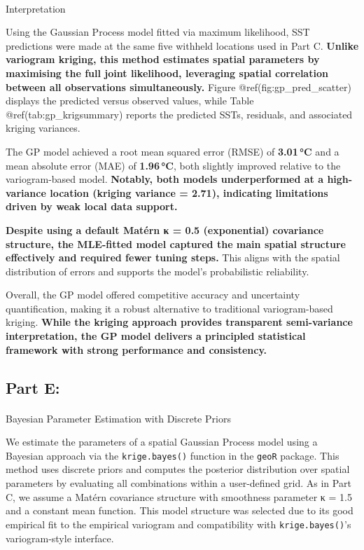 \documentclass[
  11pt,
]{article}
\makeatletter
\let\oldparagraph\paragraph
\renewcommand{\paragraph}{
    \@ifstar
      \xxxParagraphStar
      \xxxParagraphNoStar
  }
\newcommand{\xxxParagraphStar}[1]{\oldparagraph*{#1}\mbox{}}
\newcommand{\xxxParagraphNoStar}[1]{\oldparagraph{#1}\mbox{}}
\makeatother
\begin{document}
\paragraph{Interpretation}\label{interpretation}

Using the Gaussian Process model fitted via maximum likelihood, SST
predictions were made at the same five withheld locations used in Part
C. \textbf{Unlike variogram kriging, this method estimates spatial
parameters by maximising the full joint likelihood, leveraging spatial
correlation between all observations simultaneously.} Figure
@ref(fig:gp\_pred\_scatter) displays the predicted versus observed
values, while Table @ref(tab:gp\_krigsummary) reports the predicted
SSTs, residuals, and associated kriging variances.

The GP model achieved a root mean squared error (RMSE) of
\textbf{3.01\,°C} and a mean absolute error (MAE) of \textbf{1.96\,°C},
both slightly improved relative to the variogram-based model.
\textbf{Notably, both models underperformed at a high-variance location
(kriging variance = 2.71), indicating limitations driven by weak local
data support.}

\textbf{Despite using a default Matérn κ = 0.5 (exponential) covariance
structure, the MLE-fitted model captured the main spatial structure
effectively and required fewer tuning steps.} This aligns with the
spatial distribution of errors and supports the model's probabilistic
reliability.

Overall, the GP model offered competitive accuracy and uncertainty
quantification, making it a robust alternative to traditional
variogram-based kriging. \textbf{While the kriging approach provides
transparent semi-variance interpretation, the GP model delivers a
principled statistical framework with strong performance and
consistency.}

\subsection{Part E:}\label{part-e}

\paragraph{Bayesian Parameter Estimation with Discrete
Priors}\label{bayesian-parameter-estimation-with-discrete-priors}

We estimate the parameters of a spatial Gaussian Process model using a
Bayesian approach via the \texttt{krige.bayes()} function in the
\texttt{geoR} package. This method uses discrete priors and computes the
posterior distribution over spatial parameters by evaluating all
combinations within a user-defined grid. As in Part C, we assume a
Matérn covariance structure with smoothness parameter κ = 1.5 and a
constant mean function. This model structure was selected due to its
good empirical fit to the empirical variogram and compatibility with
\texttt{krige.bayes()}'s variogram-style interface.
\end{document}
